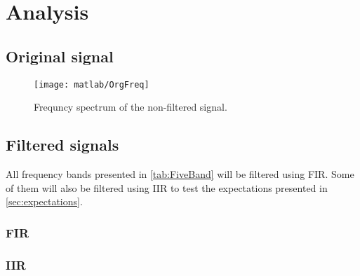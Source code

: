 
\section{Analysis}


\subsection{Original signal}

\begin{figure}[!htb]
	\centering
	\texttt{[image: matlab/OrgFreq]}
	\caption{Frequncy spectrum of the non-filtered signal.}
	\label{fig:orgfreq}
\end{figure}

\subsection{Filtered signals}
All frequency bands presented in \cref{tab:FiveBand} will be filtered using FIR. Some of them will also be filtered using IIR to test the expectations presented in \cref{sec:expectations}.

\subsubsection{FIR}


\subsubsection{IIR}
